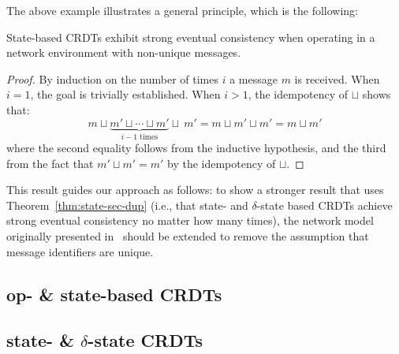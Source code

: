 The above example illustrates a general principle, which is the following:
\begin{theorem} \label{thm:state-sec-dup}
  State-based CRDTs exhibit strong eventual consistency when operating in a
  network environment with non-unique messages.
\end{theorem}
\begin{proof}
  By induction on the number of times $i$ a message $m$ is received. When $i =
  1$, the goal is trivially established. When $i > 1$, the idempotency of
  $\sqcup$ shows that:
  \[
    m \sqcup \underbrace{m' \sqcup \cdots \sqcup m'}_{\text{$i-1$ times}} \sqcup~m'
      = m \sqcup m' \sqcup m'
      = m \sqcup m'
  \]
  where the second equality follows from the inductive hypothesis, and the third
  from the fact that $m' \sqcup m' = m'$ by the idempotency of $\sqcup$.
\end{proof}

This result guides our approach as follows: to show a stronger result that uses
Theorem~\ref{thm:state-sec-dup} (i.e., that state- and $\delta$-state based
CRDTs achieve strong eventual consistency no matter how many times), the network
model originally presented in~\citep{gomes17} should be extended to remove the
assumption that message identifiers are unique.

\subsection{op- \& state-based CRDTs}
\subsection{state- \& $\delta$-state CRDTs}
